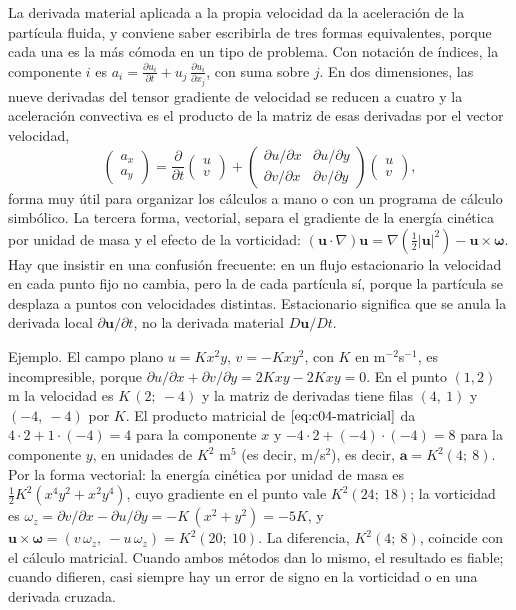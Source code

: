 \documentclass[10pt,openany]{book}
\begin{document}
La derivada material aplicada a la propia velocidad da la aceleración de la partícula fluida, y conviene saber escribirla de tres formas equivalentes, porque cada una es la más cómoda en un tipo de problema. Con notación de índices, la componente \(i\) es \(a_i = \frac{\partial u_i}{\partial t} + u_j\,\frac{\partial u_i}{\partial x_j}\), con suma sobre \(j\). En dos dimensiones, las nueve derivadas del tensor gradiente de velocidad se reducen a cuatro y la aceleración convectiva es el producto de la matriz de esas derivadas por el vector velocidad,
\begin{equation}
\begin{pmatrix} a_x \\ a_y \end{pmatrix} = \frac{\partial}{\partial t}\begin{pmatrix} u \\ v \end{pmatrix} + \begin{pmatrix} \partial u/\partial x & \partial u/\partial y \\ \partial v/\partial x & \partial v/\partial y \end{pmatrix}\begin{pmatrix} u \\ v \end{pmatrix}, \label{eq:c04-matricial}
\end{equation}
forma muy útil para organizar los cálculos a mano o con un programa de cálculo simbólico. La tercera forma, vectorial, separa el gradiente de la energía cinética por unidad de masa y el efecto de la vorticidad: \((\mathbf{u}\cdot\nabla)\mathbf{u} = \nabla\!\left(\tfrac12|\mathbf{u}|^{2}\right) - \mathbf{u}\times\boldsymbol{\omega}\). Hay que insistir en una confusión frecuente: en un flujo estacionario la velocidad en cada punto fijo no cambia, pero la de cada partícula sí, porque la partícula se desplaza a puntos con velocidades distintas. Estacionario significa que se anula la derivada local \(\partial\mathbf{u}/\partial t\), no la derivada material \(D\mathbf{u}/Dt\).

Ejemplo. El campo plano \(u = K x^{2} y\), \(v = -K x y^{2}\), con \(K\) en m\(^{-2}\)s\(^{-1}\), es incompresible, porque \(\partial u/\partial x + \partial v/\partial y = 2Kxy - 2Kxy = 0\). En el punto \((1, 2)\) m la velocidad es \(K\,(2;\ -4)\) y la matriz de derivadas tiene filas \((4,\ 1)\) y \((-4,\ -4)\) por \(K\). El producto matricial de \(\eqref{eq:c04-matricial}\) da \(4\cdot 2 + 1\cdot(-4) = 4\) para la componente \(x\) y \(-4\cdot 2 + (-4)\cdot(-4) = 8\) para la componente \(y\), en unidades de \(K^{2}\) m\(^5\) (es decir, m/s\(^2\)), es decir, \(\mathbf{a} = K^{2}(4;\ 8)\). Por la forma vectorial: la energía cinética por unidad de masa es \(\tfrac12 K^{2}(x^{4}y^{2} + x^{2}y^{4})\), cuyo gradiente en el punto vale \(K^{2}(24;\ 18)\); la vorticidad es \(\omega_z = \partial v/\partial x - \partial u/\partial y = -K\,(x^{2} + y^{2}) = -5K\), y \(\mathbf{u}\times\boldsymbol{\omega} = (v\,\omega_z,\ -u\,\omega_z) = K^{2}(20;\ 10)\). La diferencia, \(K^{2}(4;\ 8)\), coincide con el cálculo matricial. Cuando ambos métodos dan lo mismo, el resultado es fiable; cuando difieren, casi siempre hay un error de signo en la vorticidad o en una derivada cruzada.
\end{document}
